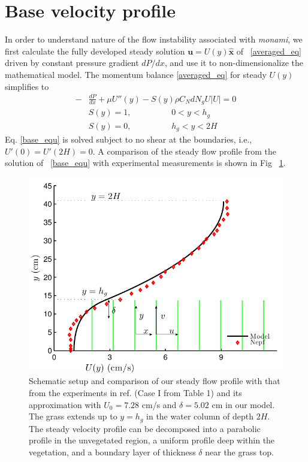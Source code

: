 \documentclass[12pt]{report}   %
\newcommand{\bu}{\mathbf{u}}
\newcommand{\hg}{h_g}
\newcommand{\monami}{\textit{monami}}
\begin{document}
\section{Base velocity profile}
In order to understand nature of the flow instability associated with \monami, we first calculate the fully developed steady solution $\bu = U(y)\boldsymbol{\hat{x}}$ of ~\eqref{averaged_eq} driven by constant pressure gradient $dP/dx$, and use it to non-dimensionalize the mathematical model. The momentum balance \eqref{averaged_eq} for steady $U(y)$ simplifies to
\begin{equation}
\begin{split}
 -&\frac{dP}{dx}+\mu U''(y) -S(y) \rho C_N d N_gU |U| =0\\
 &S(y) = 1, \hspace{2cm} 0<y<\hg\\
 &S(y) = 0, \hspace{2cm} \hg< y< 2H
\label{base_equ}
\end{split}
\end{equation}
Eq. \eqref{base_equ} is solved subject to no shear at the boundaries, i.e., $U'(0) = U'(2H) = 0$.
A comparison of the steady flow profile from the solution of ~\eqref{base_equ} with experimental measurements is shown in Fig ~\ref{basicflow}.
\begin{figure}
\centerline{\includegraphics[scale=.99]{Grass_Base_Nepf} }
\caption{
Schematic setup and comparison of our steady flow profile with that from the experiments in ref. \cite{Nepf04} (Case I from Table 1) %
 and its approximation with $U_0=7.28$ cm/s and $\delta = 5.02$ cm in our model. The grass extends up to $y=\hg$ in the water column of depth $2H$. 
The steady velocity profile can be decomposed into a parabolic profile in the unvegetated region, a uniform profile deep within the vegetation, and a boundary layer of thickness $\delta$ near the grass top. 
}
\label{basicflow}
\end{figure}
\end{document}
